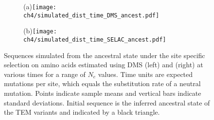 \begin{figure}
    \centering
    \begin{subfigure}
        \centering
       (a)\texttt{[image: ch4/simulated\_dist\_time\_DMS\_ancest.pdf]}
    \end{subfigure}
    \begin{subfigure}
        \centering
        (b)\texttt{[image: ch4/simulated\_dist\_time\_SELAC\_ancest.pdf]}
    \end{subfigure}
    \caption{Sequences simulated from the ancestral state under the site specific selection on amino acids estimated using DMS (left) and \selac (right) at various times for a range of $N_e$ values.
    Time units are expected mutations per site, which equals the substitution rate of a neutral mutation.
    Points indicate sample means and vertical bars indicate standard deviations. Initial sequence is the inferred ancestral state of the TEM variants and indicated by a black triangle.}
    \label{fig:dis_sim}
\end{figure}

\clearpage


